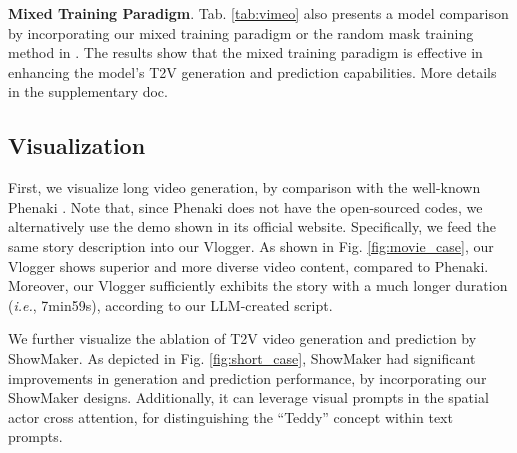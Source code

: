 \noindent\textbf{Mixed Training Paradigm}.
Tab. \ref{tab:vimeo} also presents a model comparison by incorporating our mixed training paradigm or the random mask training method in \cite{chen2023seine, voleti2022mcvd, Hoppe2022DiffusionMF, Fu2022TellMW, Yu2022MAGVITMG, Chang2022MaskGITMG}. 
The results show that the mixed training paradigm is effective in enhancing the model's T2V generation and prediction capabilities.
More details in the supplementary doc.




\subsection{Visualization}

First,
we visualize long video generation,
by comparison with the well-known Phenaki \cite{villegas2023phenaki}.
Note that,
since Phenaki does not have the open-sourced codes,
we alternatively use the demo shown in its official website.
Specifically,
we feed the same story description into our Vlogger.
As shown in Fig. \ref{fig:movie_case}, 
our Vlogger shows superior and more diverse video content,
compared to Phenaki.
Moreover,
our Vlogger sufficiently exhibits the story with a much longer duration (\textit{i.e.}, 7min59s),
according to our LLM-created script.


We further visualize the ablation of T2V video generation and prediction by ShowMaker.
As depicted in Fig. \ref{fig:short_case}, 
ShowMaker had significant improvements in generation and prediction performance,
by incorporating our ShowMaker designs.
Additionally, 
it can leverage visual prompts in the spatial actor cross attention,
for distinguishing the ``Teddy'' concept within text prompts.
